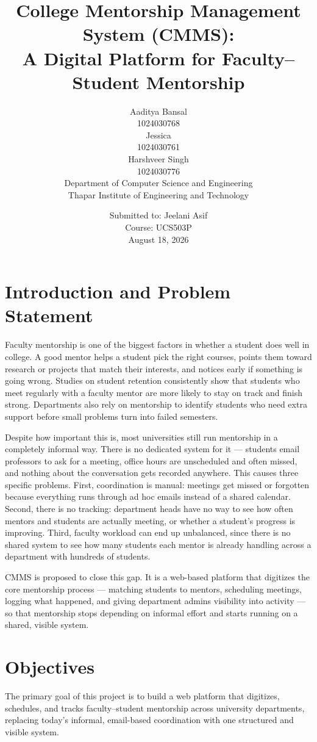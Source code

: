 \documentclass[11pt]{article}
\title{\Large\textbf{College Mentorship Management System (CMMS):}\\[0.2em]
\Large\textbf{A Digital Platform for Faculty--Student Mentorship}}
\author{
  \relax Aaditya Bansal \\ \small 1024030768 \\[0.3em]
  \relax Jessica \\ \small 1024030761 \\[0.3em]
  \relax Harshveer Singh \\ \small 1024030776 \\[0.3em]
  \small Department of Computer Science and Engineering \\
  \small Thapar Institute of Engineering and Technology
}
\date{Submitted to: Jeelani Asif \\ Course: UCS503P \\ August 18, 2026}
\begin{document}
\maketitle
\thispagestyle{empty}
\vspace{0.5em}

\section{Introduction and Problem Statement}
Faculty mentorship is one of the biggest factors in whether a student does well in college. A good mentor helps a student pick the right courses, points them toward research or projects that match their interests, and notices early if something is going wrong. Studies on student retention consistently show that students who meet regularly with a faculty mentor are more likely to stay on track and finish strong. Departments also rely on mentorship to identify students who need extra support before small problems turn into failed semesters.

Despite how important this is, most universities still run mentorship in a completely informal way. There is no dedicated system for it --- students email professors to ask for a meeting, office hours are unscheduled and often missed, and nothing about the conversation gets recorded anywhere. This causes three specific problems. First, coordination is manual: meetings get missed or forgotten because everything runs through ad hoc emails instead of a shared calendar. Second, there is no tracking: department heads have no way to see how often mentors and students are actually meeting, or whether a student's progress is improving. Third, faculty workload can end up unbalanced, since there is no shared system to see how many students each mentor is already handling across a department with hundreds of students.

CMMS is proposed to close this gap. It is a web-based platform that digitizes the core mentorship process --- matching students to mentors, scheduling meetings, logging what happened, and giving department admins visibility into activity --- so that mentorship stops depending on informal effort and starts running on a shared, visible system.

\section{Objectives}
The primary goal of this project is to build a web platform that digitizes, schedules, and tracks faculty--student mentorship across university departments, replacing today's informal, email-based coordination with one structured and visible system.
\end{document}
